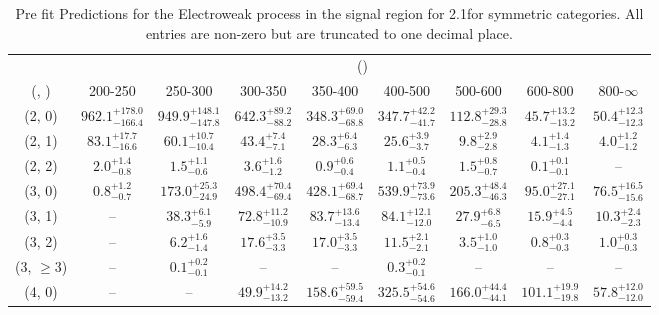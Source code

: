 \begin{table}[h!]
\tiny
\centering
\caption{Pre fit Predictions for the Electroweak process in the signal region for 2.1\ifb for symmetric categories. All entries are non-zero but are truncated to one decimal place.\label{tab:predsepnaive_sig_ewk_sym}}
\begin{tabular}
{ccccccccc}
	\hline\hline
	& \multicolumn{8}{c}{\scalht (\gev)} \\ 
	 (\njet,  \nb) & 200-250 & 250-300 & 300-350 & 350-400 & 400-500 & 500-600 & 600-800 & 800-$\infty$ \\ [0.8ex] 
\hline
	(2, 0) & $962.1^{+ 178.0 }_{- 166.4 }$ & $949.9^{+ 148.1 }_{- 147.8 }$ & $642.3^{+ 89.2 }_{- 88.2 }$ & $348.3^{+ 69.0 }_{- 68.8 }$ & $347.7^{+ 42.2 }_{- 41.7 }$ & $112.8^{+ 29.3 }_{- 28.8 }$ & $45.7^{+ 13.2 }_{- 13.2 }$ & $50.4^{+ 12.3 }_{- 12.3 }$ \\[0.5ex] 
	(2, 1) & $83.1^{+ 17.7 }_{- 16.6 }$ & $60.1^{+ 10.7 }_{- 10.4 }$ & $43.4^{+ 7.4 }_{- 7.1 }$ & $28.3^{+ 6.4 }_{- 6.3 }$ & $25.6^{+ 3.9 }_{- 3.7 }$ & $9.8^{+ 2.9 }_{- 2.8 }$ & $4.1^{+ 1.4 }_{- 1.3 }$ & $4.0^{+ 1.2 }_{- 1.2 }$ \\[0.5ex] 
	(2, 2) & $2.0^{+ 1.4 }_{- 0.8 }$ & $1.5^{+ 1.1 }_{- 0.6 }$ & $3.6^{+ 1.6 }_{- 1.2 }$ & $0.9^{+ 0.6 }_{- 0.4 }$ & $1.1^{+ 0.5 }_{- 0.4 }$ & $1.5^{+ 0.8 }_{- 0.7 }$ & $0.1^{+ 0.1 }_{- 0.1 }$ & -- \\[0.5ex] 
	(3, 0) & $0.8^{+ 1.2 }_{- 0.7 }$ & $173.0^{+ 25.3 }_{- 24.9 }$ & $498.4^{+ 70.4 }_{- 69.4 }$ & $428.1^{+ 69.4 }_{- 68.7 }$ & $539.9^{+ 73.9 }_{- 73.6 }$ & $205.3^{+ 48.4 }_{- 46.3 }$ & $95.0^{+ 27.1 }_{- 27.1 }$ & $76.5^{+ 16.5 }_{- 15.6 }$ \\[0.5ex] 
	(3, 1) & -- & $38.3^{+ 6.1 }_{- 5.9 }$ & $72.8^{+ 11.2 }_{- 10.9 }$ & $83.7^{+ 13.6 }_{- 13.4 }$ & $84.1^{+ 12.1 }_{- 12.0 }$ & $27.9^{+ 6.8 }_{- 6.5 }$ & $15.9^{+ 4.5 }_{- 4.4 }$ & $10.3^{+ 2.4 }_{- 2.3 }$ \\[0.5ex] 
	(3, 2) & -- & $6.2^{+ 1.6 }_{- 1.4 }$ & $17.6^{+ 3.5 }_{- 3.3 }$ & $17.0^{+ 3.5 }_{- 3.3 }$ & $11.5^{+ 2.1 }_{- 2.1 }$ & $3.5^{+ 1.0 }_{- 1.0 }$ & $0.8^{+ 0.3 }_{- 0.3 }$ & $1.0^{+ 0.3 }_{- 0.3 }$ \\[0.5ex] 
	(3, $\ge3$) & -- & $0.1^{+ 0.2 }_{- 0.1 }$ & -- & -- & $0.3^{+ 0.2 }_{- 0.1 }$ & -- & -- & -- \\[0.5ex] 
	(4, 0) & -- & -- & $49.9^{+ 14.2 }_{- 13.2 }$ & $158.6^{+ 59.5 }_{- 59.4 }$ & $325.5^{+ 54.6 }_{- 54.6 }$ & $166.0^{+ 44.4 }_{- 44.1 }$ & $101.1^{+ 19.9 }_{- 19.8 }$ & $57.8^{+ 12.0 }_{- 12.0 }$ \\[0.5ex] 

\end{tabular}
\end{table}
